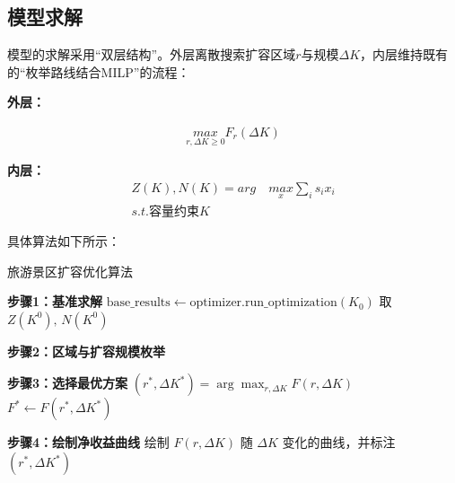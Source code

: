 \subsection[\hspace{-2pt}模型求解]{{\heiti{}\hspace{-8pt}模型求解}}\label{subsec:3-model-build}

模型的求解采用“双层结构”。外层离散搜索扩容区域$r$与规模$\Delta K$，内层维持既有的“枚举路线结合MILP”的流程：

\noindent\textbf{外层：}

\begin{equation}
  \begin{aligned}
    \underset{r,\Delta K \geq 0}{max} F_{r}(\Delta K)
  \end{aligned}
\end{equation}

\noindent\textbf{内层：}
\begin{equation}
  \begin{aligned}
    Z(K),N(K)=arg\quad \underset{x}{max} \sum_{i}s_{i}x_{i}\\
    s.t. \text{容量约束}K
  \end{aligned}
\end{equation}

具体算法如下所示：

\begin{algorithm}[H]\small
  \renewcommand{\algorithmcfname}{算法}
  \caption{旅游景区扩容优化算法}


  \textbf{步骤1：基准求解}\;
  $\text{base\_results}\leftarrow\text{optimizer.run\_optimization}(K_0)$\;
  取 $Z(K^0),\,N(K^0)$\;

  \textbf{步骤2：区域与扩容规模枚举}\;

  \textbf{步骤3：选择最优方案}\;
  $(r^*,\Delta K^*) = \arg\max_{r,\Delta K} F(r,\Delta K)$\;
  $F^* \leftarrow F(r^*,\Delta K^*)$\;

  \textbf{步骤4：绘制净收益曲线}\;
  绘制 $F(r,\Delta K)$ 随 $\Delta K$ 变化的曲线，并标注 $(r^*,\Delta K^*)$\;

  \label{algorithm:expansion_optimization}
\end{algorithm}

